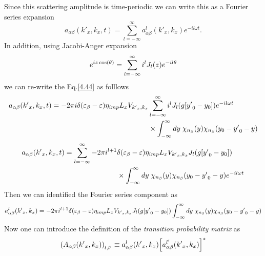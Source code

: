Since this scattering amplitude is time-periodic we can write this as a Fourier series expansion
\begin{equation} \label{4.45}
    a_{\alpha\beta}({k'}_x,k_x,t) =
    \sum_{l=-\infty}^{\infty} a^l_{\alpha\beta}({k'}_x,k_x) e^{-il\omega t}.
\end{equation}
In addition, using Jacobi-Anger expansion
\begin{equation} \label{4.46}
    e^{iz\cos(\theta)} = \sum_{l=-\infty}^{\infty} i^l J_l\qty(z) e^{-il\theta}
\end{equation}
we can re-write the Eq.\eqref{4.44} as folllows
\begin{equation} \label{4.47}
  \begin{aligned}
    a_{\alpha\beta}({k'}_x,k_x,t)  =
    -2\pi i
    \delta(\varepsilon_{\beta} - \varepsilon)
    \eta_{imp} L_x V_{{k'}_x,k_x}&
    \sum_{l=-\infty}^{\infty} i^l J_l\qty(g[{y'}_0 - y_0]) e^{-il\omega t}\\
    & \times
    \int_{-\infty}^{\infty} dy \;
    {\chi}_{n_{\beta}}\qty(y)
    {\chi}_{n_{\beta}}\qty(y_0 - {y'}_0 - y)
  \end{aligned}
\end{equation}
\begin{equation} \label{4.48}
  \begin{aligned}
    a_{\alpha\beta}({k'}_x,k_x,t)  =
    \sum_{l=-\infty}^{\infty}
    -2\pi i^{l+1} &
    \delta(\varepsilon_{\beta} - \varepsilon)
    \eta_{imp} L_x V_{{k'}_x,k_x}
    J_l\qty(g[{y'}_0 - y_0]) \\
    & \times
    \int_{-\infty}^{\infty} dy \;
    {\chi}_{n_{\beta}}\qty(y)
    {\chi}_{n_{\beta}}\qty(y_0 - {y'}_0 - y) e^{-il\omega t}
  \end{aligned}
\end{equation}
Then we can identified the Fourier series component as
\begin{equation} \label{4.49}
    a^l_{\alpha\beta}({k'}_x,k_x) =
    -2\pi i^{l+1}
    \delta(\varepsilon_{\beta} - \varepsilon)
    \eta_{imp} L_x V_{{k'}_x,k_x}
    J_l\qty(g[{y'}_0 - y_0])
    \int_{-\infty}^{\infty} dy \;
    {\chi}_{n_{\beta}}\qty(y)
    {\chi}_{n_{\beta}}\qty(y_0 - {y'}_0 - y)
\end{equation}
Now one can introduce the definition of the \textit{transition probability matrix} as
\begin{equation} \label{4.50}
    \qty(A_{\alpha\beta}({k'}_x,k_x))_{l,l'} \equiv
    a^l_{\alpha\beta}({k'}_x,k_x)\qty[a^{l'}_{\alpha\beta}({k'}_x,k_x)]^{*}
\end{equation}
